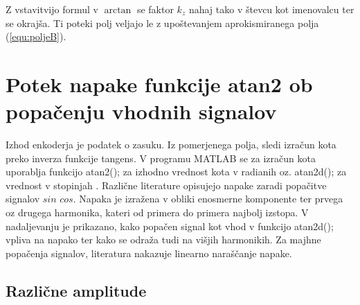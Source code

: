 Z vstavitvijo formul v $\arctan$ se faktor $k_z$ nahaj tako v števcu kot imenovalcu ter se okrajša. Ti poteki polj veljajo le z upoštevanjem aprokismiranega polja (\ref{equ:poljeB}).



\chapter{Potek napake funkcije atan2 ob popačenju vhodnih signalov}
Izhod enkoderja je podatek o zasuku. Iz pomerjenega polja, sledi izračun kota preko inverza funkcije tangens.
V programu MATLAB se za izračun kota uporablja funkcijo atan2(); za izhodno vrednost kota v radianih oz. atan2d(); za vrednost v stopinjah \cite{atan2Matlab}\cite{atan2dMatlab}. Različne literature \cite{Napaka_osnova} opisujejo napake zaradi popačitve signalov $sin$ $cos$. Napaka je izražena v obliki enosmerne komponente ter prvega oz drugega harmonika, kateri od primera do primera najbolj izstopa. V nadaljevanju je prikazano, kako popačen signal kot vhod v funkcijo atan2d(); vpliva na napako ter kako se odraža tudi na višjih harmonikih. Za majhne popačenja signalov, literatura nakazuje linearno naraščanje napake.




\section{Različne amplitude}

